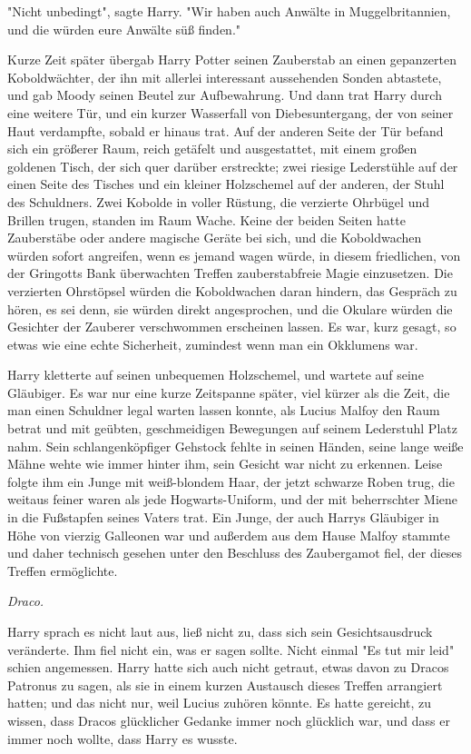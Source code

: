 {"Nicht unbedingt", sagte Harry. "Wir haben auch Anwälte in Muggelbritannien, und die würden eure Anwälte süß finden."

Kurze Zeit später übergab Harry Potter seinen Zauberstab an einen gepanzerten Koboldwächter, der ihn mit allerlei interessant aussehenden Sonden abtastete, und gab Moody seinen Beutel zur Aufbewahrung. Und dann trat Harry durch eine weitere Tür, und ein kurzer Wasserfall von Diebesuntergang, der von seiner Haut verdampfte, sobald er hinaus trat. Auf der anderen Seite der Tür befand sich ein größerer Raum, reich getäfelt und ausgestattet, mit einem großen goldenen Tisch, der sich quer darüber erstreckte; zwei riesige Lederstühle auf der einen Seite des Tisches und ein kleiner Holzschemel auf der anderen, der Stuhl des Schuldners. Zwei Kobolde in voller Rüstung, die verzierte Ohrbügel und Brillen trugen, standen im Raum Wache. Keine der beiden Seiten hatte Zauberstäbe oder andere magische Geräte bei sich, und die Koboldwachen würden sofort angreifen, wenn es jemand wagen würde, in diesem friedlichen, von der Gringotts Bank überwachten Treffen zauberstabfreie Magie einzusetzen. Die verzierten Ohrstöpsel würden die Koboldwachen daran hindern, das Gespräch zu hören, es sei denn, sie würden direkt angesprochen, und die Okulare würden die Gesichter der Zauberer verschwommen erscheinen lassen. Es war, kurz gesagt, so etwas wie eine echte Sicherheit, zumindest wenn man ein Okklumens war.

Harry kletterte auf seinen unbequemen Holzschemel, und wartete auf seine Gläubiger. Es war nur eine kurze Zeitspanne später, viel kürzer als die Zeit, die man einen Schuldner legal warten lassen konnte, als Lucius Malfoy den Raum betrat und mit geübten, geschmeidigen Bewegungen auf seinem Lederstuhl Platz nahm. Sein schlangenköpfiger Gehstock fehlte in seinen Händen, seine lange weiße Mähne wehte wie immer hinter ihm, sein Gesicht war nicht zu erkennen. Leise folgte ihm ein Junge mit weiß-blondem Haar, der jetzt schwarze Roben trug, die weitaus feiner waren als jede Hogwarts-Uniform, und der mit beherrschter Miene in die Fußstapfen seines Vaters trat. Ein Junge, der auch Harrys Gläubiger in Höhe von vierzig Galleonen war und außerdem aus dem Hause Malfoy stammte und daher technisch gesehen unter den Beschluss des Zaubergamot fiel, der dieses Treffen ermöglichte.

\emph{Draco.}

Harry sprach es nicht laut aus, ließ nicht zu, dass sich sein Gesichtsausdruck veränderte. Ihm fiel nicht ein, was er sagen sollte. Nicht einmal "Es tut mir leid" schien angemessen. Harry hatte sich auch nicht getraut, etwas davon zu Dracos Patronus zu sagen, als sie in einem kurzen Austausch dieses Treffen arrangiert hatten; und das nicht nur, weil Lucius zuhören könnte. Es hatte gereicht, zu wissen, dass Dracos glücklicher Gedanke immer noch glücklich war, und dass er immer noch wollte, dass Harry es wusste.

}
